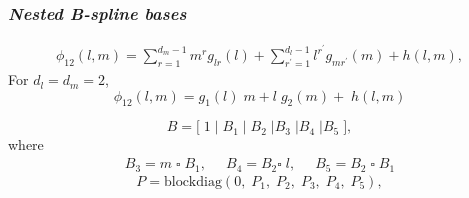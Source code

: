 \documentclass[12pt]{beamer}
\newcommand{\ms}{\scriptscriptstyle}
\begin{document}
\begin{frame}
\frametitle{\emph{Nested B-spline bases}}

\begin{align*}
 \phi_{\ms{12}}\left(l,m\right)  =   \sum_{r=1}^{\ms{d_m-1}} m^{\ms r}g_{\ms lr}\left(l\right) +  \sum_{r^\prime=1}^{\ms{d_l-1}} l^{\ms r^\prime}  g_{\ms mr^\prime}\left(m\right)+ h\left( l,m \right),
\end{align*}
\noindent
For $d_l = d_m = 2$,
\[
 \phi_{\ms{12}}\left(l,m\right)  = g_{\ms 1}\left(l\right) \; m+ l \; g_{\ms 2}\left(m\right) + \; h\left( l,m \right) 
\]

\begin{equation} \label{eq:nested-SANOVA-basis-matrix}
B = \big[  \; 1 \; \vert \;  B_1  \; \vert \;   B_2 \; \vert  B_3 \; \vert B_4 \; \vert B_5 \; \big],
\end{equation}
\noindent
where
\[
\begin{array}{ccc}
B_{\ms 3} = m \; \square \;  B_{\ms 1}, \;\; & B_{\ms 4}  = B_{\ms 2}  \square \; l, \;\; &  B_{\ms 5}= B_{\ms 2} \;\square \; B_{\ms 1} 
\end{array}
\]
\begin{equation*} \label{eq:PSANOVA-penalty}
P = \mbox{blockdiag}\left(0,\; P_1, \; P_2, \; P_{3},\; P_4, \; P_{5} \right),
\end{equation*}

\end{frame}
\end{document}
